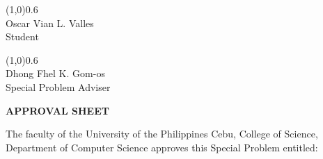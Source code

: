 \documentclass{report}
\begin{document}
\begin{center}
	\line(1,0){0.6\textwidth}\\
	Oscar Vian L. Valles\\
	Student
	\par\vspace{0.5cm}

	\line(1,0){0.6\textwidth}\\
	Dhong Fhel K. Gom-os\\
	Special Problem Adviser

	\vfill
	\hspace{0pt}

\end{center}

\newpage

\begin{center}
	\uppercase{\textbf{APPROVAL SHEET}}
\end{center}

\par\vspace{0.5cm}
\noindent
The faculty of the University of the Philippines Cebu, College of Science,
Department of Computer Science approves this Special Problem entitled:
\par\vspace{0.5cm}
\end{document}
